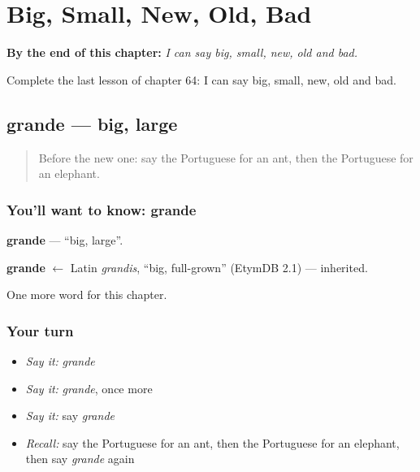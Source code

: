 
\chapter{Big, Small, New, Old, Bad}
\label{ch:pt-big-small-new-old-bad}

\begin{chapteropening}
\textbf{By the end of this chapter:} \emph{I can say big, small, new, old and bad.}

Complete the last lesson of chapter 64: I can say big, small, new, old and bad.
\end{chapteropening}

\section[grande]{grande — big, large}

\label{lesson:PT-C64-grande}



\begin{quote}
Before the new one: say the Portuguese for an ant, then the Portuguese for an elephant.
\end{quote}

\subsection*{You'll want to know: grande}
\textbf{grande} — \textquotedblleft{}big, large\textquotedblright{}.

\begin{cousinweb}
\textbf{grande} $\leftarrow$ Latin \emph{grandis}, \textquotedblleft{}big, full-grown\textquotedblright{} (EtymDB 2.1) — inherited.
\end{cousinweb}

\begin{grammarlens}[title={What you've built}]
One more word for this chapter.
\end{grammarlens}

\subsection*{Your turn}
\begin{itemize}
\raggedright
  \item \emph{Say it:} \emph{grande}
  \item \emph{Say it:} \emph{grande}, once more
  \item \emph{Say it:} say \emph{grande}
  \item \emph{Recall:} say the Portuguese for an ant, then the Portuguese for an elephant, then say \emph{grande} again
\end{itemize}

